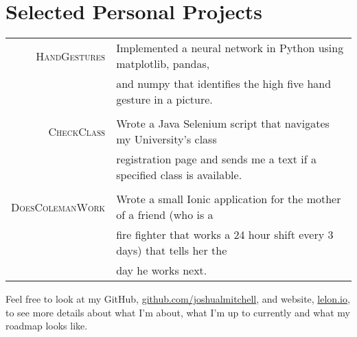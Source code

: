 \documentclass[a4paper,10pt]{article}
\begin{document}
\section{Selected Personal Projects}
\begin{tabular}{rl}
 \textsc{HandGestures} & Implemented a neural network in Python using matplotlib, pandas, \\
 
 & 
 
and numpy that identifies the high five hand gesture in a picture. \\

& \\
\textsc{CheckClass} & Wrote a Java Selenium script that navigates my University’s class \\
& registration page and sends me a text if a specified class is available. \\

& \\
\textsc{DoesColemanWork} & Wrote a small Ionic application for the mother of a friend (who is a \\
& fire fighter that works a 24 hour shift every 3 days) that tells her the \\

& day he works next. \\
\end{tabular}

Feel free to look at my GitHub, \href {https://github.com/joshualmitchell}{github.com/joshualmitchell}, and website, \href {http://lelon.io/}{lelon.io}, to see more details about what I'm about, what I'm up to currently and what my roadmap looks like.
\end{document}
